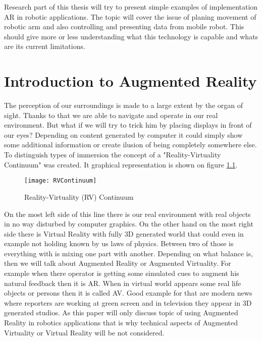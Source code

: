 \documentclass[printmode,en]{mgr}
\begin{document}
Research part of this thesis will try to present simple examples of implementation AR in robotic applications. The topic will cover the issue of planing movement of robotic arm and also controlling and presenting data from mobile robot. This should give more or less understanding what this technology is capable and whats are its current limitations.


\chapter{Introduction to Augmented Reality}
The perception of our surroundings is made to a large extent by the organ of sight. Thanks to that we are able to navigate and operate in our real environment. But what if we will try to trick him by placing displays in front of our eyes? Depending on content generated by computer it could simply show some additional information or create ilusion of being completely somewhere else. To distinguish types of immersion the concept of a "Reality-Virtuality Continuum" \cite{RVContinuum} was created. It graphical representation is shown on figure \ref{fig:RVContinuum}.

\begin{figure}[!ht]
  \centering
    \texttt{[image: RVContinuum]}
  \caption{Reality-Virtuality (RV) Continuum \cite{RVContinuum}}
  \label{fig:RVContinuum}
\end{figure}

On the most left side of this line there is our real environment with real objects in no way disturbed by computer graphics. On the other hand on the most right side there is Virtual Reality with fully 3D generated world that could even in example not holding known by us laws of physics. Between two of those is everything with is mixing one part with another. Depending on what balance is, then we will talk about Augmented Reality or Augmented Virtuality. For example when there operator is getting some simulated cues to augment his natural feedback then it is AR. When in virtual world appears some real life objects or persons then it is called AV. Good example for that are modern news where reporters are working at green screen and in television they appear in 3D generated studios. As this paper will only discuss topic of using Augmented Reality in robotics applications that is why technical aspects of Augmented Virtuality or Virtual Reality will be not considered.
\end{document}
